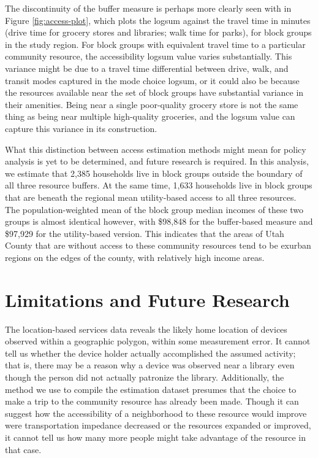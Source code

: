\documentclass[3p, authoryear]{elsarticle} %
\begin{document}
The discontinuity of the buffer measure is perhaps more clearly seen with in
Figure \ref{fig:access-plot}, which plots the logsum against the travel time
in minutes (drive time for grocery stores and libraries; walk time for parks),
for block groups in the study region. For block groups with equivalent travel
time to a particular community resource, the accessibility logsum value
varies substantially. This variance might be due to a travel time differential
between drive, walk, and transit modes captured in the mode choice logsum, or it
could also be because the resources available near the set of block groups have
substantial variance in their amenities. Being near a single poor-quality
grocery store is not the same thing as being near multiple high-quality
groceries, and the logsum value can capture this variance in its construction.

What this distinction between access estimation methods might mean for policy
analysis is yet to be determined, and future research is required. In this analysis,
we estimate that 2,385 households live in block groups outside the
boundary of all three resource buffers. At the same time, 1,633 households
live in block groups that are beneath the regional mean utility-based access to
all three resources. The population-weighted mean of the block group median
incomes of these two groups is almost identical however, with \$98,848
for the buffer-based measure and \$97,929 for the utility-based version.
This indicates that the areas of Utah County that are without access to these
community resources tend to be exurban regions on the edges of the county,
with relatively high income areas.

\hypertarget{limitations-and-future-research}{%
\section{Limitations and Future Research}\label{limitations-and-future-research}}

The location-based services data reveals the likely home location of devices
observed within a geographic polygon, within some measurement error.
It cannot tell us whether the device holder actually accomplished the assumed
activity; that is, there may be a reason why a device was observed near a
library even though the person did not actually patronize the library.
Additionally, the method we use to compile the estimation dataset presumes that
the choice to make a trip to the community resource has already been made. Though
it can suggest how the accessibility of a neighborhood to these resource would improve
were transportation impedance decreased or the resources expanded or improved,
it cannot tell us how many more people might take advantage of the resource
in that case.
\end{document}
